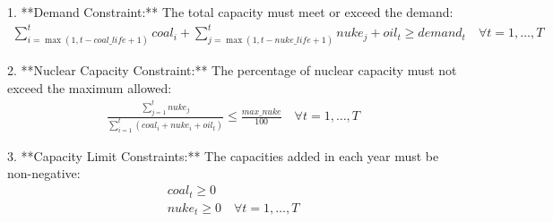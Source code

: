 \documentclass{article}
\begin{document}
1. **Demand Constraint:**
   The total capacity must meet or exceed the demand:
   \begin{align*}
   \sum_{i=\max(1, t - coal\_life + 1)}^{t} coal_i + \sum_{j=\max(1, t - nuke\_life + 1)}^{t} nuke_j + oil_t \geq demand_t \quad \forall t = 1, \ldots, T
   \end{align*}

2. **Nuclear Capacity Constraint:**
   The percentage of nuclear capacity must not exceed the maximum allowed:
   \begin{align*}
   \frac{\sum_{j=1}^{t} nuke_j}{\sum_{i=1}^{t} (coal_i + nuke_i + oil_t)} \leq \frac{max\_nuke}{100} \quad \forall t = 1, \ldots, T
   \end{align*}

3. **Capacity Limit Constraints:**
   The capacities added in each year must be non-negative:
   \begin{align*}
   coal_t \geq 0 \\
   nuke_t \geq 0 \quad \forall t = 1, \ldots, T
   \end{align*}
\end{document}
